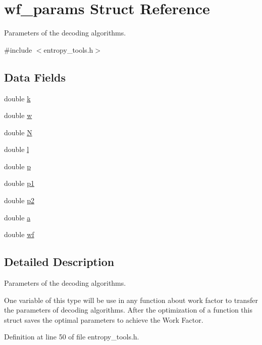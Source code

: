 \hypertarget{structwf__params}{\section{wf\-\_\-params \-Struct \-Reference}
\label{structwf__params}
}


\-Parameters of the decoding algorithms.  




{\ttfamily \#include $<$entropy\-\_\-tools.\-h$>$}

\subsection*{\-Data \-Fields}
\begin{DoxyCompactItemize}
\item 
double \hyperlink{structwf__params_ac8a270bda1a0784095b5ec578129c28a}{k}
\item 
double \hyperlink{structwf__params_afb3248bab1c7ee0ad97e9d4c275b4c67}{w}
\item 
double \hyperlink{structwf__params_aed54e3f02ef7426fd92cd6e7e1cd181c}{\-N}
\item 
double \hyperlink{structwf__params_a59e80b8ba32c12c6d0a868f17a19ae48}{l}
\item 
double \hyperlink{structwf__params_aace2d484b0e3651abd108f04803d316c}{p}
\item 
double \hyperlink{structwf__params_afe3ec2bbc515ef1c2c03dccf567831f4}{p1}
\item 
double \hyperlink{structwf__params_afb3d783e05c27da8ea3c53c9d2e17af1}{p2}
\item 
double \hyperlink{structwf__params_a1031d0e0a97a340abfe0a6ab9e831045}{a}
\item 
double \hyperlink{structwf__params_a3d48e7e4501d1f62ef751e2643e37c51}{wf}
\end{DoxyCompactItemize}


\subsection{\-Detailed \-Description}
\-Parameters of the decoding algorithms. 

\-One variable of this type will be use in any function about work factor to transfer the parameters of decoding algorithms. \-After the optimization of a function this struct saves the optimal parameters to achieve the \-Work \-Factor.

\-Definition at line 50 of file entropy\-\_\-tools.\-h.


